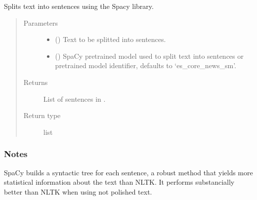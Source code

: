 \documentclass[letterpaper,10pt,english]{sphinxmanual}
\begin{document}

\begin{fulllineitems}
\label{\detokenize{code:utils.split_text_into_sentences_spacy}}
\sphinxAtStartPar
Splits text into sentences using the Spacy library.
\begin{quote}\begin{description}
\item[{Parameters}] \leavevmode\begin{itemize}
\item {} 
\sphinxAtStartPar
{} () \textendash{} Text to be splitted into sentences.

\item {} 
\sphinxAtStartPar
{} (\sphinxstyleliteralemphasis{\sphinxupquote{, }}) \textendash{} SpaCy pretrained model used to split text into sentences or pretrained
model identifier, defaults to ‘es\_core\_news\_sm’.

\end{itemize}

\item[{Returns}] \leavevmode
\sphinxAtStartPar
List of sentences in .

\item[{Return type}] \leavevmode
\sphinxAtStartPar
list

\end{description}\end{quote}
\subsubsection*{Notes}

\sphinxAtStartPar
SpaCy builds a syntactic tree for each sentence, a robust method that yields
more statistical information about the text than NLTK. It performs substancially
better than NLTK when using not polished text.

\end{fulllineitems}
\end{document}
